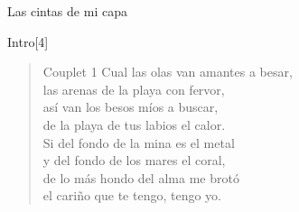 \begin{song}{Las cintas de mi capa}

\begin{instrumental}{Intro}[4]
  \measure{}  \measure{} \measure{} 
  \measure{}  \measure{}  \measure{} 
\end{instrumental}

\begin{verse}{Couplet 1}
Cual las olas van amantes a besar,\\
las arenas de la playa con fervor,\\
así van los besos míos a buscar,\\
de la playa de tus labios el calor.\\
Si del fondo de la mina es el metal\\
y del fondo de los mares el coral,\\
de lo más hondo del alma me brotó\\
el cariño que te tengo, tengo yo.\hspace{2em}  \hspace{2em}\hspace{1em} 
\end{verse}


\end{song}
